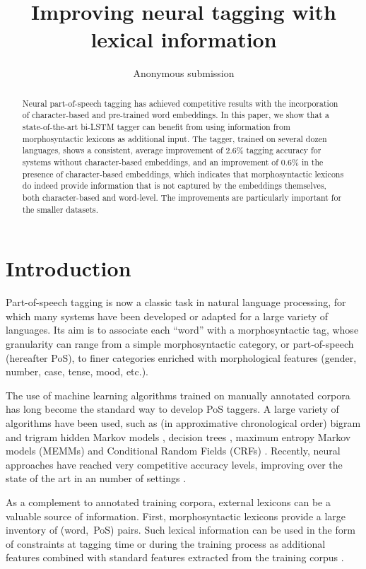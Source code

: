 \documentclass[11pt,letterpaper]{article}
\title{Improving neural tagging with lexical information}
\author{Anonymous submission}
\date{}
\begin{document}
\maketitle

\begin{abstract}
  Neural part-of-speech tagging has achieved competitive results with the incorporation of character-based and
  pre-trained word embeddings. In this paper, we show that a state-of-the-art bi-LSTM tagger can benefit from using
  information from morphosyntactic lexicons as additional input. The tagger, trained on several dozen languages, shows a
  consistent, average improvement of 2.6\% tagging accuracy for systems without character-based embeddings, and an
  improvement of 0.6\% in the presence of character-based embeddings, which indicates that morphosyntactic lexicons do
  indeed provide information that is not captured by the embeddings themselves, both character-based and word-level. The
  improvements are particularly important for the smaller datasets.
\end{abstract}


\section{Introduction}

Part-of-speech tagging is now a classic task in natural language processing, for which many systems have been developed
or adapted for a large variety of languages. Its aim is to associate each ``word'' with a morphosyntactic tag, whose
granularity can range from a simple morphosyntactic category, or part-of-speech (hereafter PoS), to finer categories
enriched with morphological features (gender, number, case, tense, mood, etc.).

The use of machine learning algorithms trained on manually annotated corpora has long become the standard way to develop
PoS taggers. A large variety of algorithms have been used, such as (in approximative chronological order) bigram and
trigram hidden Markov models \cite{merialdo94,brants96,brants00}, decision trees \cite{schmid94,magerman95}, maximum
entropy Markov models (MEMMs) \cite{ratnaparkhi96} and Conditional Random Fields (CRFs)
\cite{lafferty01,constant12}. Recently, neural approaches have reached very competitive accuracy levels, improving over
the state of the art in an number of settings \cite{plank16}.

As a complement to  annotated training corpora, external lexicons can be a valuable source of information.
First, morphosyntactic lexicons provide a large inventory of (word,~PoS)
pairs. Such lexical information can be used in the form of constraints at tagging time \cite{kim99,hajic00tagging} or
during the training process as additional features combined with standard features extracted from the training corpus
\cite{chrupala08,goldberg09,denis12}.
\end{document}
